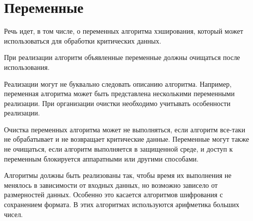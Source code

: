 \section{Переменные}\label{COMMON.Vars}

%
Речь идет, в том числе, о переменных алгоритма хэширования, 
который может использоваться для обработки критических данных.

При реализации алгоритм объявленные переменные должны очищаться после 
использования. 

Реализации могут не буквально следовать описанию алгоритма.
Например, переменная алгоритма может быть представлена несколькими 
переменными реализации. При организации очистки необходимо учитывать 
особенности реализации.

Очистка переменных алгоритма может не выполняться, если алгоритм все-таки 
не обрабатывает и не возвращает критические данные.
%
Переменные могут также не очищаться, если алгоритм выполняется в защищенной 
среде, и доступ к переменным блокируется аппаратными или другими способами.

Алгоритмы должны быть реализованы так, чтобы время их выполнения не 
менялось в зависимости от входных данных, но возможно зависело от 
размерностей данных. Особенно это касается алгоритмов шифрования с 
сохранением формата. В этих алгоритмах используются арифметика больших 
чисел.
\fi
